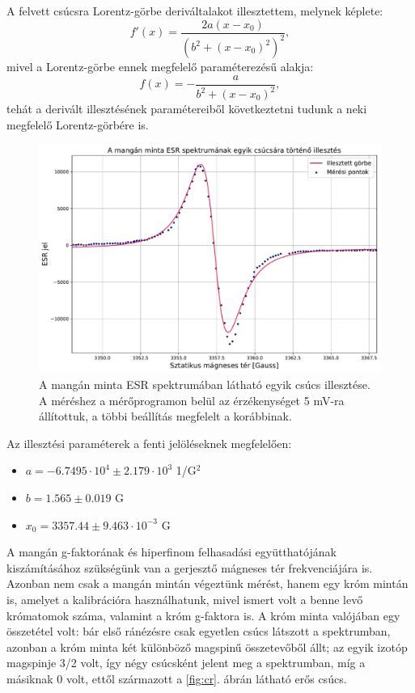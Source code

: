 \documentclass[12pt,a4paper]{article}
\begin{document}
\newline
A felvett csúcsra Lorentz-görbe deriváltalakot illesztettem, melynek képlete:
\begin{equation}
f'(x)=\frac{2a(x-x_{0})}{(b^2+(x-x_{0})^2)^2},
\end{equation}
mivel a Lorentz-görbe ennek megfelelő paraméterezésű alakja:
\begin{equation}
f(x)=- \frac{a}{b^2+(x-x_{0})^2},
\end{equation}
 tehát a derivált illesztésének paramétereiből következtetni tudunk a neki megfelelő Lorentz-görbére is.\\
\begin{figure}[!h]
\centering
\includegraphics[scale=0.5]{mang_reszl}
\caption{A mangán minta ESR spektrumában látható egyik csúcs illesztése. A méréshez a mérőprogramon belül az érzékenységet 5 mV-ra állítottuk, a többi beállítás megfelelt a korábbinak.}
\label{fig:mn_csucs}
\end{figure}
\newline
Az illesztési paraméterek a fenti jelöléseknek megfelelően:
\begin{itemize}
\item{$a=-6.7495 \cdot 10^{4} \pm 2.179 \cdot 10^{3}$ 1/G$^2$}
\item{$b=1.565 \pm 0.019$ G}
\item{$x_0=3357.44 \pm 9.463 \cdot 10^{-3}$ G}
\end{itemize}
\newpage
A mangán g-faktorának és hiperfinom felhasadási együtthatójának kiszámításához szükségünk van a gerjesztő mágneses tér frekvenciájára is. Azonban nem csak a mangán mintán végeztünk mérést, hanem egy króm mintán is, amelyet a kalibrációra használhatunk, mivel ismert volt a benne levő krómatomok száma, valamint a króm g-faktora is. A króm minta valójában egy összetétel volt: bár első ránézésre csak egyetlen csúcs látszott a spektrumban, azonban a króm minta két különböző magspinű összetevőből állt; az egyik izotóp magspinje 3/2 volt, így négy csúcsként jelent meg a spektrumban, míg a másiknak 0 volt, ettől származott a \ref{fig:cr}. ábrán látható erős csúcs.\\
\end{document}
